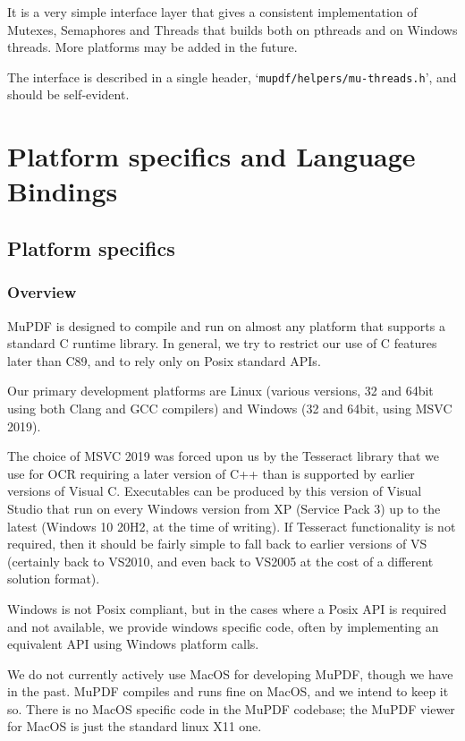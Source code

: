 \documentclass[oneside]{book}
\begin{document}
It is a very simple interface layer that gives a consistent implementation of Mutexes, Semaphores and Threads that builds both on pthreads and on Windows threads. More platforms may be added in the future.

The interface is described in a single header, `\texttt{mupdf\slash helpers\slash mu-threads.h}', and should be self-evident.

\part{Platform specifics and Language Bindings}

\chapter{Platform specifics}
\label{PlatformSpecifics}

\section{Overview}

MuPDF is designed to compile and run on almost any platform that supports a standard C runtime library. In general, we try to restrict our use of C features later than C89, and to rely only on Posix standard APIs.

Our primary development platforms are Linux (various versions, 32 and 64bit using both Clang and GCC compilers) and Windows (32 and 64bit, using MSVC 2019).

The choice of MSVC 2019 was forced upon us by the Tesseract library that we use for OCR requiring a later version of C++ than is supported by earlier versions of Visual C. Executables can be produced by this version of Visual Studio that run on every Windows version from XP (Service Pack 3) up to the latest (Windows 10 20H2, at the time of writing). If Tesseract functionality is not required, then it should be fairly simple to fall back to earlier versions of VS (certainly back to VS2010, and even back to VS2005 at the cost of a different solution format).

Windows is not Posix compliant, but in the cases where a Posix API is required and not available, we provide windows specific code, often by implementing an equivalent API using Windows platform calls.

We do not currently actively use MacOS for developing MuPDF, though we have in the past. MuPDF compiles and runs fine on MacOS, and we intend to keep it so. There is no MacOS specific code in the MuPDF codebase; the MuPDF viewer for MacOS is just the standard linux X11 one.
\end{document}
